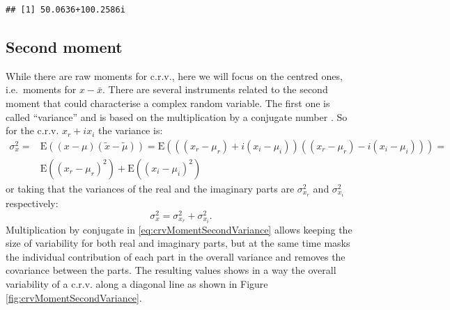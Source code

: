 \documentclass[
]{book}
\begin{document}
\begin{verbatim}
## [1] 50.0636+100.2586i
\end{verbatim}

\hypertarget{crvSecondMoment}{%
\subsection{Second moment}\label{crvSecondMoment}}

While there are raw moments for c.r.v., here we will focus on the centred ones, i.e.~moments for \(x-\bar{x}\). There are several instruments related to the second moment that could characterise a complex random variable. The first one is called ``variance'' and is based on the multiplication by a conjugate number \citep{reference}. So for the c.r.v. \(x_r + i x_i\) the variance is:
\begin{equation}
    \begin{aligned}
    \sigma_x^2 = & \mathrm{E}((x-\mu) (\tilde{x}-\tilde{\mu})) = \mathrm{E}\left(((x_r-\mu_{r}) + i (x_i-\mu_{i}))((x_r-\mu_{r}) - i (x_i-\mu_{i}))\right) = \\
                & \mathrm{E}((x_r-\mu_{r})^2) +  \mathrm{E}((x_i-\mu_{i})^2)
    \end{aligned}
    \label{eq:crvMomentSecondVariance}
\end{equation}
or taking that the variances of the real and the imaginary parts are \(\sigma_{x_r}^2\) and \(\sigma_{x_i}^2\) respectively:
\begin{equation}
    \sigma_x^2 = \sigma_{x_r}^2 + \sigma_{x_i}^2.
    \label{eq:crvMomentSecondVarianceShort}
\end{equation}
Multiplication by conjugate in \eqref{eq:crvMomentSecondVariance} allows keeping the size of variability for both real and imaginary parts, but at the same time masks the individual contribution of each part in the overall variance and removes the covariance between the parts. The resulting values shows in a way the overall variability of a c.r.v. along a diagonal line as shown in Figure \ref{fig:crvMomentSecondVariance}.
\end{document}
